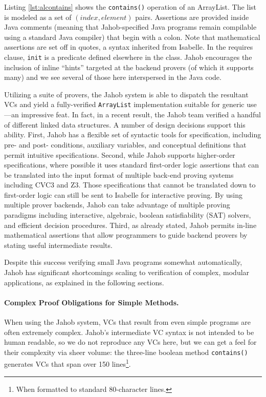 Listing \ref{lst:alcontains} shows the \texttt{contains()} operation of an ArrayList.  The list is modeled as a set of $(index, element)$ pairs.  Assertions are provided inside Java comments (meaning that Jahob-specified Java programs remain compilable using a standard Java compiler) that begin with a colon.  Note that mathematical assertions are set off in quotes, a syntax inherited from Isabelle.  In the requires clause, \texttt{init} is a predicate defined elsewhere in the class.  Jahob encourages the inclusion of inline ``hints'' targeted at the backend provers\cite{zeeIntegratedProofLanguage} (of which it supports many) and we see several of those here interspersed in the Java code.



Utilizing a suite of provers, the Jahob system is able to dispatch the resultant VCs and yield a fully-verified \texttt{ArrayList} implementation suitable for generic use---an impressive feat.  In fact, in a recent result, the Jahob team verified a handful of different linked data structures\cite{zee:annotations}.  A number of design decisions support this ability.  First, Jahob has a flexible set of syntactic tools for specification, including pre- and post- conditions, auxiliary variables\cite{kingVerifier}, and conceptual definitions that permit intuitive specifications.  Second, while Jahob supports higher-order specifications, where possible it uses standard first-order logic assertions that can be translated into the input format of multiple back-end proving systems including CVC3\cite{barretCVC3} and Z3\cite{deMouraZ3}.  Those specifications that cannot be translated down to first-order logic can still be sent to Isabelle for interactive proving.  By using multiple prover backends, Jahob can take advantage of multiple proving paradigms including interactive, algebraic, boolean satisfiability (SAT) solvers, and efficient decision procedures.  Third, as already stated, Jahob permits in-line mathematical assertions that allow programmers to guide backend provers by stating useful intermediate results.

Despite this success verifying small Java programs somewhat automatically, Jahob has significant shortcomings scaling to verification of complex, modular applications, as explained in the following sections.


\paragraph{Complex Proof Obligations for Simple Methods.\label{sec:jahobComplexVCs}}
When using the Jahob system, VCs that result from even simple programs are often extremely complex. Jahob's intermediate VC syntax is not intended to be human readable, so we do not reproduce any VCs here, but we can get a feel for their complexity via sheer volume: the three-line boolean method \texttt{contains()} generates VCs that span over 150 lines\footnote{When formatted to standard 80-character lines.}.  

